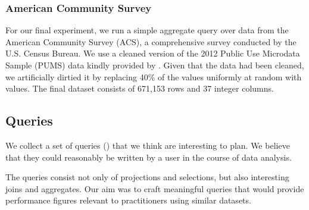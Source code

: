 \subsubsection{American Community Survey}
For our final experiment, we run a simple aggregate query over data from the American
Community Survey (ACS), a comprehensive survey conducted by the U.S.
Census Bureau. We use a cleaned version of the 2012 Public Use Microdata Sample (PUMS)
data kindly provided by \citeauthor*{akande2015empirical}. Given that the data had
been cleaned, we artificially dirtied it by replacing 40\% of the values uniformly at random with \nullv{} values.
The final dataset consists of 671,153 rows and 37 integer columns.

\subsection{Queries}
We collect a set of queries () that we think are interesting to plan.
We believe that they could reasonably be written by a user in the course of data analysis.

The queries consist not only of projections and selections, but also
interesting joins and aggregates. Our aim was to craft meaningful queries that would
provide performance figures relevant to practitioners using similar datasets.

%

